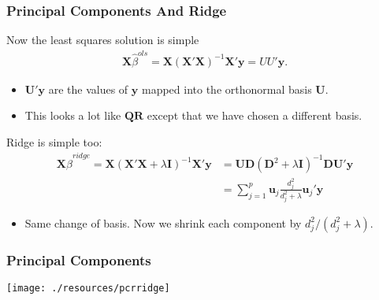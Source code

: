\documentclass[xcolor=pdftex,dvipsnames,table,mathserif,aspectratio=169]{beamer}
\begin{document}
\begin{frame}
\frametitle{Principal Components And Ridge}
Now the least squares solution is simple
\begin{align*}
\mathbf{X} \hat{\beta}^{ols} = \mathbf{X} (\mathbf{X}'\mathbf{X})^{-1} \mathbf{X}' \mathbf{y} = U U' \mathbf{y}.
\end{align*}
\begin{itemize}
\item $\mathbf{U}' \mathbf{y}$ are the values of $\mathbf{y}$ mapped into the orthonormal basis $\mathbf{U}$.
\item This looks a lot like $\mathbf{QR}$ except that we have chosen a different basis.
\end{itemize}
Ridge is simple too:
\begin{align*}
\mathbf{X} \hat{\beta}^{ridge} = \mathbf{X} (\mathbf{X}'\mathbf{X} + \lambda \mathbf{I})^{-1} \mathbf{X}' \mathbf{y} &= \mathbf{U D} (\mathbf{D}^2 + \lambda \mathbf{I})^{-1} \mathbf{D} \mathbf{U}' \mathbf{y}\\
&= \sum_{j=1}^p \mathbf{u}_j  \frac{d_j^2}{d_j^2 + \lambda} \mathbf{u}_j' \mathbf{y}
\end{align*}
\begin{itemize}
\item Same change of basis. Now we shrink each component by $d_j^2/(d_j^2 + \lambda)$.
\end{itemize}
\end{frame}



\begin{frame}
\frametitle{Principal Components}
\begin{center}
\texttt{[image: ./resources/pcrridge]}
\end{center}
\end{frame}
\end{document}
